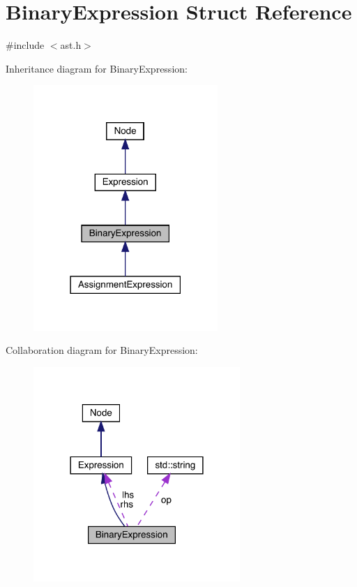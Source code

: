 \hypertarget{struct_binary_expression}{}\section{Binary\+Expression Struct Reference}
\label{struct_binary_expression}


{\ttfamily \#include $<$ast.\+h$>$}



Inheritance diagram for Binary\+Expression\+:\nopagebreak
\begin{figure}[H]
\begin{center}
\leavevmode
\includegraphics[width=198pt]{struct_binary_expression__inherit__graph}
\end{center}
\end{figure}


Collaboration diagram for Binary\+Expression\+:\nopagebreak
\begin{figure}[H]
\begin{center}
\leavevmode
\includegraphics[width=222pt]{struct_binary_expression__coll__graph}
\end{center}
\end{figure}
